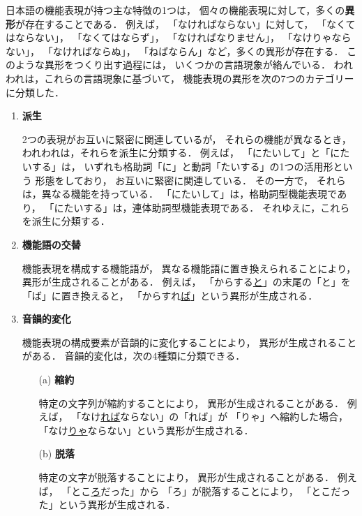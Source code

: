 \documentclass[japanese]{jnlp_1.3e}
\begin{document}
日本語の機能表現が持つ主な特徴の1つは，
個々の機能表現に対して，多くの{\bf 異形}が存在することである．
例えば，
「なければならない」に対して，
「なくてはならない」，
「なくてはならず」，
「なければなりません」，
「なけりゃならない」，
「なければならぬ」，
「ねばならん」など，多くの異形が存在する．
このような異形をつくり出す過程には，
いくつかの言語現象が絡んでいる．
われわれは，これらの言語現象に基づいて，
機能表現の異形を次の7つのカテゴリーに分類した．
\begin{enumerate}
\item {\bf 派生}

      2つの表現がお互いに緊密に関連しているが，
      それらの機能が異なるとき，
      われわれは，それらを派生に分類する．
      例えば，
      「にたいして」と「にたいする」は，
      いずれも格助詞「に」と動詞「たいする」の1つの活用形という
      形態をしており，
      お互いに緊密に関連している．
      その一方で，
      それらは，異なる機能を持っている．
      「にたいして」は，格助詞型機能表現であり，
      「にたいする」は，連体助詞型機能表現である．
      それゆえに，これらを派生に分類する．
      
\item {\bf 機能語の交替}

      機能表現を構成する機能語が，
      異なる機能語に置き換えられることにより，
      異形が生成されることがある．
      例えば，
      「からする\ul{と}」の末尾の「と」を「ば」に置き換えると，
      「からすれ\ul{ば}」という異形が生成される．

\item {\bf 音韻的変化}

      機能表現の構成要素が音韻的に変化することにより，
      異形が生成されることがある．
      音韻的変化は，次の4種類に分類できる．
      \begin{enumerate}
       \item[(a)] {\bf 縮約}
                  
                  特定の文字列が縮約することにより，
                  異形が生成されることがある．
                  例えば，
                  「なけ\ul{れば}ならない」の「れば」が
                  「りゃ」へ縮約した場合，
                  「なけ\ul{りゃ}ならない」という異形が生成される．
                  
       \item[(b)] {\bf 脱落}

                  特定の文字が脱落することにより，
                  異形が生成されることがある．
                  例えば，
                  「とこ\ul{ろ}だった」から
                  「ろ」が脱落することにより，
                  「とこだった」という異形が生成される．
                  

\end{enumerate}
\end{enumerate}
\end{document}

